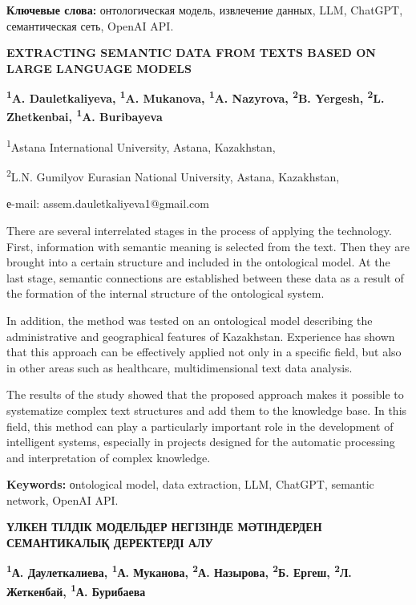 {\bfseries Ключевые слова:} онтологическая модель, извлечение данных, LLM,
ChatGPT, семантическая сеть, OpenAI API.

\begin{articleheader}
{\bfseries EXTRACTING SEMANTIC DATA FROM TEXTS BASED ON LARGE LANGUAGE MODELS}

{\bfseries
\textsuperscript{1}A. Dauletkaliyeva\textsuperscript{\envelope },
\textsuperscript{1}A. Mukanova,
\textsuperscript{1}A. Nazyrova,
\textsuperscript{2}B. Yergesh,
\textsuperscript{2}L. Zhetkenbai,
\textsuperscript{1}A. Buribayeva
}
\end{articleheader}

\begin{affiliation}
\textsuperscript{1}Astana International University, Astana, Kazakhstan,

\textsuperscript{2}L.N. Gumilyov Eurasian National University, Astana, Kazakhstan,

е-mail: assem.dauletkaliyeva1@gmail.com
\end{affiliation}

There are several interrelated stages in the process of applying the
technology. First, information with semantic meaning is selected from
the text. Then they are brought into a certain structure and included in
the ontological model. At the last stage, semantic connections are
established between these data as a result of the formation of the
internal structure of the ontological system.

In addition, the method was tested on an ontological model describing
the administrative and geographical features of Kazakhstan. Experience
has shown that this approach can be effectively applied not only in a
specific field, but also in other areas such as healthcare,
multidimensional text data analysis.

The results of the study showed that the proposed approach makes it
possible to systematize complex text structures and add them to the
knowledge base. In this field, this method can play a particularly
important role in the development of intelligent systems, especially in
projects designed for the automatic processing and interpretation of
complex knowledge.

{\bfseries Keywords:} оntological model, data extraction, LLM, ChatGPT,
semantic network, OpenAI API.

\begin{articleheader}
{\bfseries ҮЛКЕН ТІЛДІК МОДЕЛЬДЕР НЕГІЗІНДЕ МӘТІНДЕРДЕН СЕМАНТИКАЛЫҚ ДЕРЕКТЕРДІ АЛУ}

{\bfseries
\textsuperscript{1}А. Даулеткалиева\textsuperscript{\envelope },
\textsuperscript{1}А. Муканова,
\textsuperscript{2}А. Назырова,
\textsuperscript{2}Б. Ергеш,
\textsuperscript{2}Л. Жеткенбай,
\textsuperscript{1}А. Бурибаева
}
\end{articleheader}

